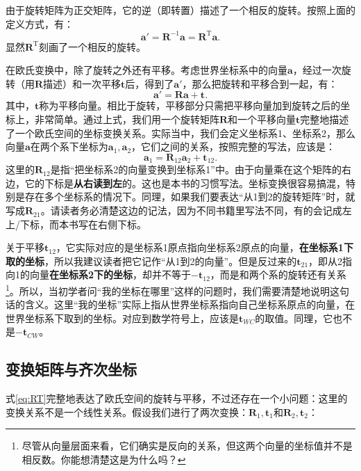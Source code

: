 由于旋转矩阵为正交矩阵，它的逆（即转置）描述了一个相反的旋转。按照上面的定义方式，有：
\begin{equation}
\bm{a}' = \bm{R}^{-1} \bm{a} =\bm{R}^\mathrm{T} \bm{a} .
\end{equation}
显然$\bm{R}^\mathrm{T}$刻画了一个相反的旋转。

在欧氏变换中，除了旋转之外还有平移。考虑世界坐标系中的向量$\bm{a}$，经过一次旋转（用$\bm{R}$描述）和一次平移$\bm{t}$后，得到了$\bm{a}'$，那么把旋转和平移合到一起，有：
\begin{equation}
\label{eq:RT}
\bm{a}' = \bm{R} \bm{a} + \bm{t}.
\end{equation}
其中，$\bm{t}$称为平移向量。相比于旋转，平移部分只需把平移向量加到旋转之后的坐标上，非常简单。通过上式，我们用一个旋转矩阵$\bm{R}$和一个平移向量$\bm{t}$完整地描述了一个欧氏空间的坐标变换关系。实际当中，我们会定义坐标系1、坐标系2，那么向量$\bm{a}$在两个系下坐标为$\bm{a}_1, \bm{a}_2$，它们之间的关系，按照完整的写法，应该是：
\begin{equation}
\bm{a}_1 = \bm{R}_{12} \bm{a}_2 + \bm{t}_{12}.
\end{equation}
这里的$\bm{R}_{12}$是指“把坐标系2的向量变换到坐标系1”中。由于向量乘在这个矩阵的右边，它的下标是\textbf{从右读到左}的。这也是本书的习惯写法。坐标变换很容易搞混，特别是存在多个坐标系的情况下。同理，如果我们要表达“从1到2的旋转矩阵”时，就写成$\bm{R}_{21}$。请读者务必清楚这边的记法，因为不同书籍里写法不同，有的会记成左上/下标，而本书写在右侧下标。

关于平移$\bm{t}_{12}$，它实际对应的是坐标系1原点指向坐标系2原点的向量，\textbf{在坐标系1下取的坐标}，所以我建议读者把它记作“从1到2的向量”。但是反过来的$\bm{t}_{21}$，即从2指向1的向量\textbf{在坐标系2下的坐标}，却并不等于$-\bm{t}_{12}$，而是和两个系的旋转还有关系\footnote{尽管从向量层面来看，它们确实是反向的关系，但这两个向量的坐标值并不是相反数。你能想清楚这是为什么吗？}。所以，当初学者问“我的坐标在哪里”这样的问题时，我们需要清楚地说明这句话的含义。这里“我的坐标”实际上指从世界坐标系指向自己坐标系原点的向量，在世界坐标系下取到的坐标。对应到数学符号上，应该是$\bm{t}_{WC}$的取值。同理，它也不是$-\bm{t}_{CW}$。

\subsection{变换矩阵与齐次坐标}

式\eqref{eq:RT}完整地表达了欧氏空间的旋转与平移，不过还存在一个小问题：这里的变换关系不是一个线性关系。假设我们进行了两次变换：$\bm{R}_1,\bm{t}_1$和$\bm{R}_2,\bm{t}_2$：

